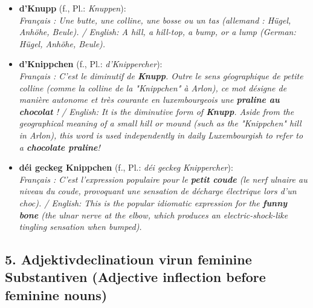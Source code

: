 \begin{itemize}
    \item \textbf{d'Knupp} (f., Pl.: \textit{Knuppen}): \\
    \textit{Français : Une butte, une colline, une bosse ou un tas (allemand : Hügel, Anhöhe, Beule). / English: A hill, a hill-top, a bump, or a lump (German: Hügel, Anhöhe, Beule).}
    
    \item \textbf{d'Knippchen} (f., Pl.: \textit{d'Knippercher}): \\
    \textit{Français : C'est le diminutif de \textbf{Knupp}. Outre le sens géographique de petite colline (comme la colline de la "Knippchen" à Arlon), ce mot désigne de manière autonome et très courante en luxembourgeois une \textbf{praline au chocolat} ! / English: It is the diminutive form of \textbf{Knupp}. Aside from the geographical meaning of a small hill or mound (such as the "Knippchen" hill in Arlon), this word is used independently in daily Luxembourgish to refer to a \textbf{chocolate praline}! }
    
    \item \textbf{déi geckeg Knippchen} (f., Pl.: \textit{déi geckeg Knippercher}): \\
    \textit{Français : C'est l'expression populaire pour le \textbf{petit coude} (le nerf ulnaire au niveau du coude, provoquant une sensation de décharge électrique lors d'un choc). / English: This is the popular idiomatic expression for the \textbf{funny bone} (the ulnar nerve at the elbow, which produces an electric-shock-like tingling sensation when bumped).}
\end{itemize}

\subsection*{5. Adjektivdeclinatioun virun feminine Substantiven (Adjective inflection before feminine nouns)}

